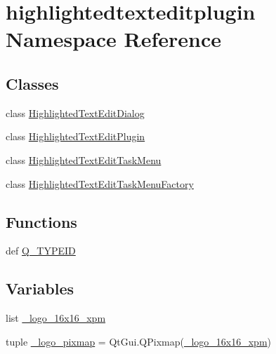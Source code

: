 \hypertarget{namespacehighlightedtexteditplugin}{}\section{highlightedtexteditplugin Namespace Reference}
\label{namespacehighlightedtexteditplugin}
\subsection*{Classes}
\begin{DoxyCompactItemize}
\item 
class \hyperlink{classhighlightedtexteditplugin_1_1HighlightedTextEditDialog}{Highlighted\+Text\+Edit\+Dialog}
\item 
class \hyperlink{classhighlightedtexteditplugin_1_1HighlightedTextEditPlugin}{Highlighted\+Text\+Edit\+Plugin}
\item 
class \hyperlink{classhighlightedtexteditplugin_1_1HighlightedTextEditTaskMenu}{Highlighted\+Text\+Edit\+Task\+Menu}
\item 
class \hyperlink{classhighlightedtexteditplugin_1_1HighlightedTextEditTaskMenuFactory}{Highlighted\+Text\+Edit\+Task\+Menu\+Factory}
\end{DoxyCompactItemize}
\subsection*{Functions}
\begin{DoxyCompactItemize}
\item 
def \hyperlink{namespacehighlightedtexteditplugin_aa9dd7c90e3c16567e36001ec5e2a5bf4}{Q\+\_\+\+T\+Y\+P\+E\+I\+D}
\end{DoxyCompactItemize}
\subsection*{Variables}
\begin{DoxyCompactItemize}
\item 
list \hyperlink{namespacehighlightedtexteditplugin_a93f22d2fcd0cc21b6ec06ed964c91a37}{\+\_\+logo\+\_\+16x16\+\_\+xpm}
\item 
tuple \hyperlink{namespacehighlightedtexteditplugin_aa2e7df502e88e17abc31f2778d4cc94c}{\+\_\+logo\+\_\+pixmap} = Qt\+Gui.\+Q\+Pixmap(\hyperlink{namespacehighlightedtexteditplugin_a93f22d2fcd0cc21b6ec06ed964c91a37}{\+\_\+logo\+\_\+16x16\+\_\+xpm})
\end{DoxyCompactItemize}


